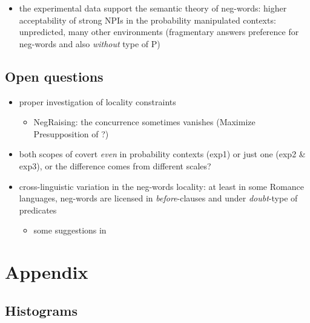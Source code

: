 \documentclass[
  letterpaper,
  DIV=11,
  numbers=noendperiod]{scrartcl}
\providecommand{\tightlist}{%
  \setlength{\itemsep}{0pt}\setlength{\parskip}{0pt}}\usepackage{longtable,booktabs,array}
\begin{document}
\begin{itemize}
\tightlist
\item
  the experimental data support the semantic theory of neg-words: higher
  acceptability of strong NPIs in the probability manipulated contexts:
  unpredicted, many other environments (fragmentary answers preference
  for neg-words and also \emph{without} type of P)
\end{itemize}

\hypertarget{open-questions}{%
\subsection{Open questions}\label{open-questions}}

\begin{itemize}
\tightlist
\item
  proper investigation of locality constraints

  \begin{itemize}
  \tightlist
  \item
    NegRaising: the concurrence sometimes vanishes (Maximize
    Presupposition of \cite{heim1991articles}?)
  \end{itemize}
\item
  both scopes of covert \emph{even} in probability contexts (exp1) or
  just one (exp2 \& exp3), or the difference comes from different
  scales?
\item
  cross-linguistic variation in the neg-words locality: at least in some
  Romance languages, neg-words are licensed in \emph{before}-clauses and
  under \emph{doubt}-type of predicates

  \begin{itemize}
  \tightlist
  \item
    some suggestions in \cite{kuhn2022dynamics}
  \end{itemize}
\end{itemize}

\hypertarget{appendix}{%
\section{Appendix}\label{appendix}}

\hypertarget{histograms}{%
\subsection{Histograms}\label{histograms}}
\end{document}
